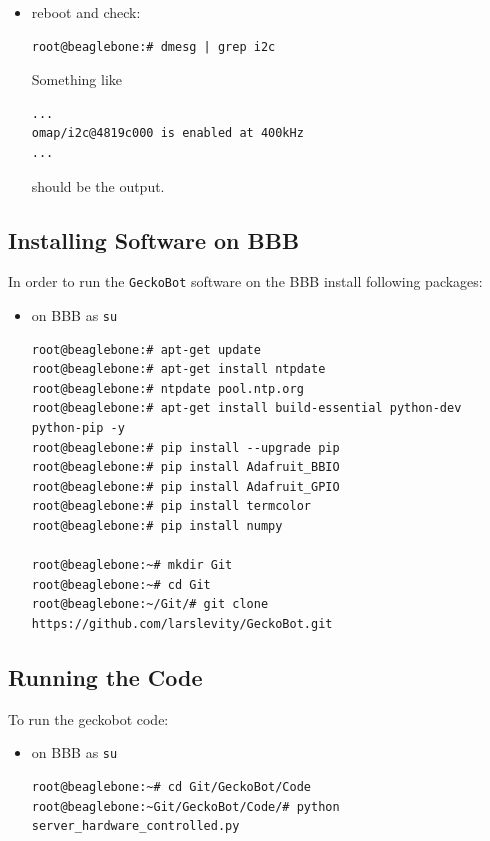 \documentclass[
	fontsize=10pt
	paper=a4
]{scrartcl}
\begin{document}
\begin{itemize}
\item reboot and check:
\begin{lstlisting}
root@beaglebone:# dmesg | grep i2c
\end{lstlisting}
Something like
\begin{lstlisting}
... 
omap/i2c@4819c000 is enabled at 400kHz
...
\end{lstlisting}
should be the output.


\end{itemize}















\subsection{Installing Software on BBB}
In order to run the \texttt{GeckoBot} software on the BBB install following packages:
\begin{itemize}
\item on BBB as \texttt{su}
\begin{lstlisting}
root@beaglebone:# apt-get update
root@beaglebone:# apt-get install ntpdate
root@beaglebone:# ntpdate pool.ntp.org
root@beaglebone:# apt-get install build-essential python-dev python-pip -y
root@beaglebone:# pip install --upgrade pip
root@beaglebone:# pip install Adafruit_BBIO
root@beaglebone:# pip install Adafruit_GPIO
root@beaglebone:# pip install termcolor
root@beaglebone:# pip install numpy

root@beaglebone:~# mkdir Git
root@beaglebone:~# cd Git
root@beaglebone:~/Git/# git clone https://github.com/larslevity/GeckoBot.git

\end{lstlisting}
\end{itemize}



\subsection{Running the Code}
To run the geckobot code:
\begin{itemize}
\item on BBB as \texttt{su}
\begin{lstlisting}
root@beaglebone:~# cd Git/GeckoBot/Code
root@beaglebone:~Git/GeckoBot/Code/# python server_hardware_controlled.py
\end{lstlisting}
\end{itemize}
\end{document}
